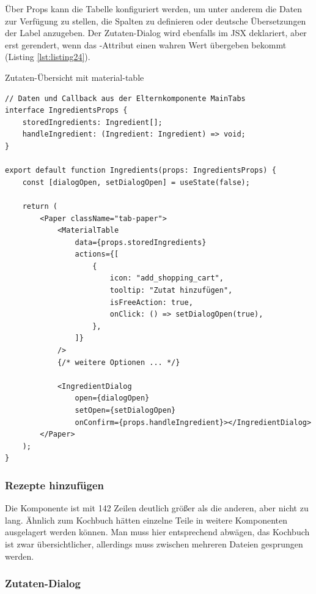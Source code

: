 Über Props kann die Tabelle konfiguriert werden, um unter anderem die Daten zur Verfügung zu stellen, die Spalten zu definieren oder deutsche Übersetzungen der Label anzugeben. Der Zutaten-Dialog wird ebenfalls im JSX deklariert, aber erst gerendert, wenn das -Attribut einen wahren Wert übergeben bekommt (Listing \ref{lst:listing24}).

\begin{listing}
\caption{Zutaten-Übersicht mit material-table}
\label{lst:listing24}
\begin{verbatim}
// Daten und Callback aus der Elternkomponente MainTabs
interface IngredientsProps {
    storedIngredients: Ingredient[];
    handleIngredient: (Ingredient: Ingredient) => void;
}

export default function Ingredients(props: IngredientsProps) {
    const [dialogOpen, setDialogOpen] = useState(false);

    return (
        <Paper className="tab-paper">
            <MaterialTable
                data={props.storedIngredients}
                actions={[
                    {
                        icon: "add_shopping_cart",
                        tooltip: "Zutat hinzufügen",
                        isFreeAction: true,
                        onClick: () => setDialogOpen(true),
                    },
                ]}
            />
            {/* weitere Optionen ... */}

            <IngredientDialog
                open={dialogOpen}
                setOpen={setDialogOpen}
                onConfirm={props.handleIngredient}></IngredientDialog>
        </Paper>
    );
}
\end{verbatim}
\end{listing}

\subsubsection{Rezepte hinzufügen}

Die Komponente ist mit 142 Zeilen deutlich größer als die anderen, aber nicht zu lang. Ähnlich zum Kochbuch hätten einzelne Teile in weitere Komponenten ausgelagert werden können. Man muss hier entsprechend abwägen, das Kochbuch ist zwar übersichtlicher, allerdings muss zwischen mehreren Dateien gesprungen werden.

\subsubsection{Zutaten-Dialog}

